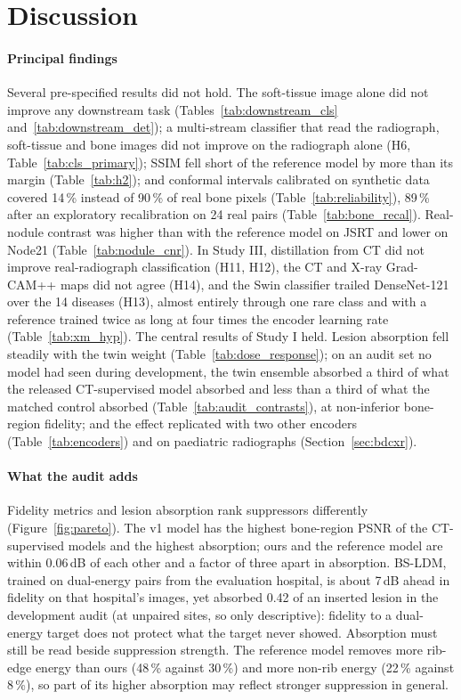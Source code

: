 \section{Discussion}
\label{sec:discussion}
\paragraph{Principal findings} Several pre-specified results did not hold. The soft-tissue image alone did not improve any downstream task
(Tables~\ref{tab:downstream_cls} and~\ref{tab:downstream_det}); a multi-stream classifier that read the radiograph, soft-tissue and bone
images did not improve on the radiograph alone (H6, Table~\ref{tab:cls_primary}); SSIM fell short of the reference model by more than its
margin (Table~\ref{tab:h2}); and conformal intervals calibrated on synthetic data covered 14\,\% instead of 90\,\% of real bone pixels
(Table~\ref{tab:reliability}), 89\,\% after an exploratory recalibration on 24 real pairs (Table~\ref{tab:bone_recal}). Real-nodule contrast
was higher than with the reference model on JSRT and lower on Node21 (Table~\ref{tab:nodule_cnr}). In Study III, distillation from CT did not
improve real-radiograph classification (H11, H12), the CT and X-ray Grad-CAM++ maps did not agree (H14), and the Swin classifier trailed
DenseNet-121 over the 14 diseases (H13), almost entirely through one rare class and with a reference trained twice as long at four times
the encoder learning rate (Table~\ref{tab:xm_hyp}). The central results of Study I held.
Lesion absorption fell steadily with the twin weight (Table~\ref{tab:dose_response}); on an audit set no model had seen during development,
the twin ensemble absorbed a third of what the released CT-supervised model absorbed and less than a third of what the matched control
absorbed (Table~\ref{tab:audit_contrasts}), at non-inferior bone-region fidelity; and the effect replicated with two other encoders
(Table~\ref{tab:encoders}) and on paediatric radiographs (Section~\ref{sec:bdcxr}).

\paragraph{What the audit adds} Fidelity metrics and lesion absorption rank suppressors differently (Figure~\ref{fig:pareto}). The v1 model
has the highest bone-region PSNR of the CT-supervised models and the highest absorption; ours and the reference model are within 0.06\,dB of
each other and a factor of three apart in absorption. BS-LDM, trained on dual-energy pairs from the evaluation hospital, is about 7\,dB ahead
in fidelity on that hospital's images, yet absorbed 0.42 of an inserted lesion in the development audit (at unpaired sites, so only
descriptive): fidelity to a dual-energy target does not protect what the target never showed. Absorption must still be read beside
suppression strength. The reference model removes more rib-edge energy than ours (48\,\% against 30\,\%) and more non-rib energy (22\,\%
against 8\,\%), so part of its higher absorption may reflect stronger suppression in general.

